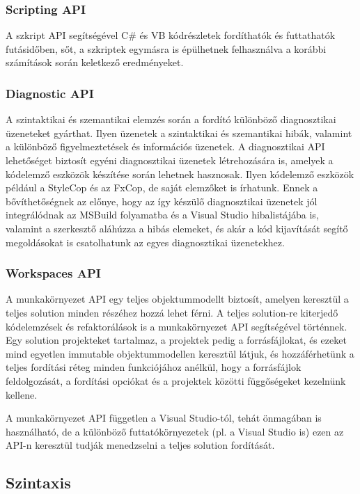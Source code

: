 \documentclass[12pt, a4paper]{report}
\begin{document}
\subsubsection{Scripting API}

A szkript API segítségével C\# és VB kódrészletek fordíthatók és futtathatók futásidőben, sőt, a szkriptek egymásra is épülhetnek felhasználva a korábbi számítások során keletkező eredményeket.

\subsubsection{Diagnostic API}

A szintaktikai és szemantikai elemzés során a fordító különböző diagnosztikai üzeneteket gyárthat. Ilyen üzenetek a szintaktikai és szemantikai hibák, valamint a különböző figyelmeztetések és információs üzenetek. A diagnosztikai API lehetőséget biztosít egyéni diagnosztikai üzenetek létrehozására is, amelyek a kódelemző eszközök készítése során lehetnek hasznosak. Ilyen kódelemző eszközök például a StyleCop és az FxCop, de saját elemzőket is írhatunk. Ennek a bővíthetőségnek az előnye, hogy az így készülő diagnosztikai üzenetek jól integrálódnak az MSBuild folyamatba és a Visual Studio hibalistájába is, valamint a szerkesztő aláhúzza a hibás elemeket, és akár a kód kijavítását segítő megoldásokat is csatolhatunk az egyes diagnosztikai üzenetekhez.

\subsubsection{Workspaces API}

A munkakörnyezet API egy teljes objektummodellt biztosít, amelyen keresztül a teljes solution minden részéhez hozzá lehet férni. A teljes solution-re kiterjedő kódelemzések és refaktorálások is a munkakörnyezet API segítségével történnek. Egy solution projekteket tartalmaz, a projektek pedig a forrásfájlokat, és ezeket mind egyetlen immutable objektummodellen keresztül látjuk, és hozzáférhetünk a teljes fordítási réteg minden funkciójához anélkül, hogy a forrásfájlok feldolgozását, a fordítási opciókat és a projektek közötti függőségeket kezelnünk kellene.

A munkakörnyezet API független a Visual Studio-tól, tehát önmagában is használható, de a különböző futtatókörnyezetek (pl. a Visual Studio is) ezen az API-n keresztül tudják menedzselni a teljes solution fordítását.


\subsection{Szintaxis}
\end{document}
